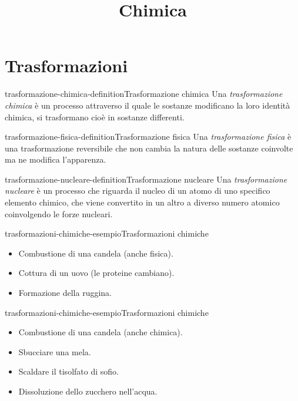 \documentclass[preview]{standalone}
\begin{document}
\title{Chimica}
\genpage

\section{Trasformazioni}


\begin{snippetdefinition}{trasformazione-chimica-definition}{Trasformazione chimica}
    Una \textit{trasformazione chimica}
    è un processo attraverso il quale le sostanze modificano la loro identità chimica,
    si trasformano cioè in sostanze differenti.
\end{snippetdefinition}

\begin{snippetdefinition}{trasformazione-fisica-definition}{Trasformazione fisica}
    Una \textit{trasformazione fisica} è una trasformazione reversibile
    che non cambia la natura delle sostanze coinvolte ma ne modifica l'apparenza.
\end{snippetdefinition}

\begin{snippetdefinition}{trasformazione-nucleare-definition}{Trasformazione nucleare}
    Una \textit{trasformazione nucleare}
    è un processo che riguarda il nucleo di un atomo di uno specifico elemento chimico,
    che viene convertito in un altro a diverso numero atomico coinvolgendo le forze nucleari.
\end{snippetdefinition}

\begin{snippetexample}{trasformazioni-chimiche-esempio}{Trasformazioni chimiche}
    \begin{itemize}
        \item Combustione di una candela (anche fisica).
        \item Cottura di un uovo (le proteine cambiano).
        \item Formazione della ruggina.
    \end{itemize}
\end{snippetexample}

\begin{snippetexample}{trasformazioni-chimiche-esempio}{Trasformazioni chimiche}
    \begin{itemize}
        \item Combustione di una candela (anche chimica).
        \item Sbucciare una mela.
        \item Scaldare il tisolfato di sofio.
        \item Dissoluzione dello zucchero nell'acqua.
    \end{itemize}
\end{snippetexample}
\end{document}
